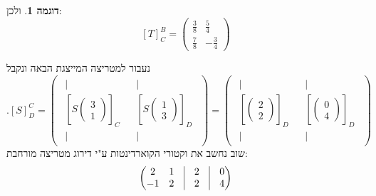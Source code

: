 \documentclass[12pt]{report}
\theoremstyle{plain}
\theoremstyle{definition}
\newtheorem{example}{דוגמה}[chapter]
\newcommand{\0}{\mathbf{0}}
\begin{document}
\begin{example}
ולכן:
$$
[T]_C^B=\begin{pmatrix}
\frac{3}{8} & \frac{5}{4} \\
\frac{7}{8} & -\frac{3}{4}
\end{pmatrix}
$$

נעבור למטריצה המייצגת הבאה ונקבל
$$
.[S]_D^C=\begin{pmatrix}
\begin{array}{c}
|\\[-0.4ex]
\left[S\begin{pmatrix}3\\1\end{pmatrix}\right]_C\\[-0.4ex]
|
\end{array}
&
\begin{array}{c}
|\\[-0.4ex]
\left[S\begin{pmatrix}1\\3\end{pmatrix}\right]_D\\[-0.4ex]
|
\end{array}
\end{pmatrix}=\begin{pmatrix}
\begin{array}{c}
|\\[-0.4ex]
\left[\begin{pmatrix}2\\2\end{pmatrix}\right]_D\\[-0.4ex]
|
\end{array}
&
\begin{array}{c}
|\\[-0.4ex]
\left[\begin{pmatrix}0\\4\end{pmatrix}\right]_D\\[-0.4ex]
|
\end{array}
\end{pmatrix}
$$
שוב נחשב את וקטורי הקוארדינטות ע"י דירוג מטריצה מורחבת:
$$
\begin{pmatrix}
2 & 1 & \vline & 2 & \vline & 0 \\
-1 & 2 & \vline & 2 & \vline & 4
\end{pmatrix}
$$
\end{example}
\end{document}

